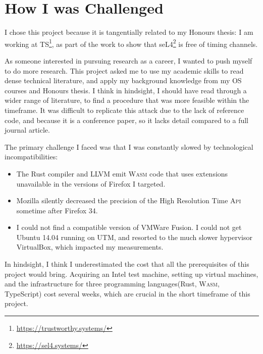 \documentclass[a4paper,10pt,twocolumn]{article}
\theoremstyle{definition}
\newcommand*{\code}{\texttt}
\newcommand*{\acronym}{\textsc}
\newcommand*{\API}{\acronym{Api}}
\newcommand*{\WASM}{\acronym{Wasm}}
\begin{document}

\section{How I was Challenged}
\label{sec:challenged}

I chose this project because it is tangentially related to my Honours thesis: I
am working at TS\footnote{\url{https://trustworthy.systems/}}, as part of the
work to show that seL4\footnote{\url{https://sel4.systems/}} is free of timing channels.

As someone interested in pursuing research as a career, I wanted to push myself
to do more research.
This project asked me to use my academic skills to read dense technical
literature, and apply my background knowledge from my OS courses and Honours
thesis.
I think in hindsight, I should have read through a wider range of literature, to
find a procedure that was more feasible within the timeframe.
It was difficult to replicate this attack due to the lack of reference code, and
because it is a conference paper, so it lacks detail compared to a full journal article.

The primary challenge I faced was that I was constantly slowed by technological incompatibilities:
\begin{itemize}
  \item The Rust compiler and LLVM emit \WASM{} code that uses extensions
    unavailable in the versions of Firefox I targeted.
  \item Mozilla silently decreased the precision of the High Resolution Time
    \API{} sometime after Firefox 34.
  \item I could not find a compatible version of VMWare Fusion. I could not get
    Ubuntu 14.04 running on UTM, and resorted to the much slower hypervisor
    VirtualBox, which impacted my measurements.
\end{itemize}
In hindsight, I think I underestimated the cost that all the prerequisites of
this project would bring.
Acquiring an Intel test machine, setting up virtual machines, and the
infrastructure for three programming languages(Rust, \WASM{}, TypeScript) cost
several weeks, which are crucial in the short timeframe of this project.
\end{document}
